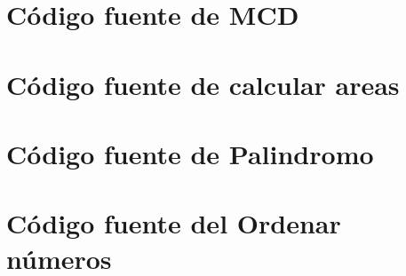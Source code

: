 \documentclass[12pt,letterpaper]{article}
\begin{document}
\section{C\'odigo fuente de MCD} 
\label{code:CMD}

\section{C\'odigo fuente de calcular areas} 
\label{code:calcular_area}

\section{C\'odigo fuente de Palindromo} 
\label{code:palindromo}

\section{C\'odigo fuente del Ordenar n\'umeros} 
\label{code:ordenar_numeros}

\end{document}
